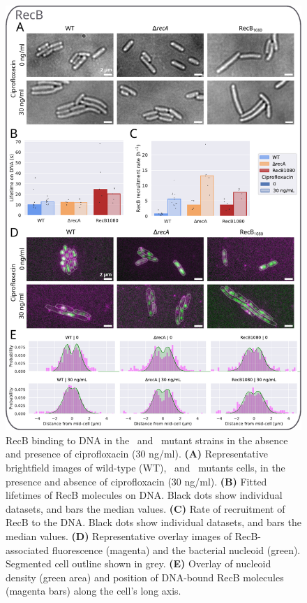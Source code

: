 \begin{figure}[htbp]
    \centering
    \includegraphics[width=.75\textwidth]{Figures/Fig4_mutants.pdf}
    \caption{RecB binding to DNA in the \dreca\ and \teneighty\ mutant strains in the absence and presence of ciprofloxacin (30 ng/ml). \textbf{(A)} Representative brightfield images of wild-type (WT), \dreca\ and \teneighty\ mutants cells, in the presence and absence of ciprofloxacin (30 ng/ml). \textbf{(B)} Fitted lifetimes of RecB molecules on DNA. Black dots show individual datasets, and bars the median values. \textbf{(C)} Rate of recruitment of RecB to the DNA. Black dots show individual datasets, and bars the median values. \textbf{(D)} Representative overlay images of RecB-associated fluorescence (magenta) and the bacterial nucleoid (green). Segmented cell outline shown in grey. \textbf{(E)} Overlay of nucleoid density (green area) and position of DNA-bound RecB molecules (magenta bars) along the cell's long axis.}
    \label{Fig:mutants}
\end{figure}

